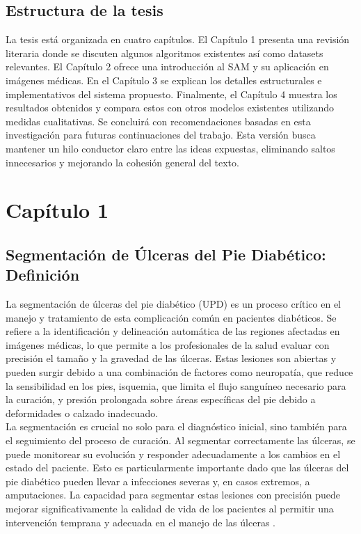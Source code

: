 \documentclass[12pt]{article}
\begin{document}
	\subsection{Estructura de la tesis}
	La tesis está organizada en cuatro capítulos. El Capítulo 1 presenta una revisión literaria donde se discuten algunos algoritmos existentes así como datasets relevantes. El Capítulo 2 ofrece una introducción al SAM y su aplicación en imágenes médicas. En el Capítulo 3 se explican los detalles estructurales e implementativos del sistema propuesto. Finalmente, el Capítulo 4 muestra los resultados obtenidos y compara estos con otros modelos existentes utilizando medidas cualitativas. Se concluirá con recomendaciones basadas en esta investigación para futuras continuaciones del trabajo. Esta versión busca mantener un hilo conductor claro entre las ideas expuestas, eliminando saltos innecesarios y mejorando la cohesión general del texto.

	
	
	
	\newpage
	
	\section{Cap\'itulo 1}
		\subsection{Segmentación de Úlceras del Pie Diabético: Definición}
		
		La segmentación de úlceras del pie diabético (UPD) es un proceso crítico en el manejo y tratamiento de esta complicación común en pacientes diabéticos. Se refiere a la identificación y delineación automática de las regiones afectadas en imágenes médicas, lo que permite a los profesionales de la salud evaluar con precisión el tamaño y la gravedad de las úlceras. Estas lesiones son abiertas y pueden surgir debido a una combinación de factores como neuropatía, que reduce la sensibilidad en los pies, isquemia, que limita el flujo sanguíneo necesario para la curación, y presión prolongada sobre áreas específicas del pie debido a deformidades o calzado inadecuado.
		\\
		
		La segmentación es crucial no solo para el diagnóstico inicial, sino también para el seguimiento del proceso de curación. Al segmentar correctamente las úlceras, se puede monitorear su evolución y responder adecuadamente a los cambios en el estado del paciente. Esto es particularmente importante dado que las úlceras del pie diabético pueden llevar a infecciones severas y, en casos extremos, a amputaciones. La capacidad para segmentar estas lesiones con precisión puede mejorar significativamente la calidad de vida de los pacientes al permitir una intervención temprana y adecuada en el manejo de las úlceras \cite{Pereira2018}.
		\\
		
\end{document}
